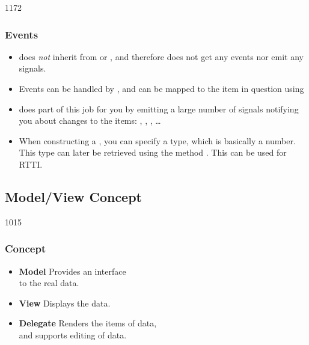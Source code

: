\begin{slide}{1172}\frametitle{Events}
\begin{itemize}
\item {} does \emph{not} inherit from
   or , and therefore does not get any
  events nor emit any signals.
\item Events can be handled by , and can be mapped to the
  item in question using 
\item {} does part of this job for you by emitting a large
  number of signals notifying you about changes to the items:
  , , ,
  \ldots
\item When constructing a , you can specify a type,
  which is basically a number. This type can later be retrieved using the
  method . This can be used for RTTI.
\end{itemize}
\end{slide}

\subsection{Model/View  Concept}
\begin{slide}{1015}\frametitle{Concept}\label{model_view_concepts}
\begin{itemize}
\item \textbf{Model} Provides an interface\\
  to the real data.
\item \textbf{View} Displays the data.
\item \textbf{Delegate} Renders the items of data,\\
  and supports editing of data.
\end{itemize}
\hspace{30mm}
\end{slide}

